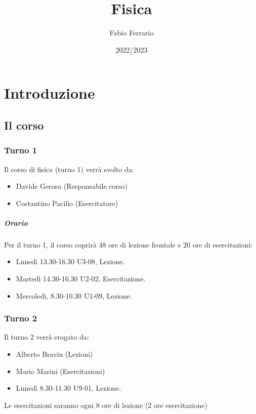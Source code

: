 \documentclass[12pt, a4paper, openany]{book}
\begin{document}
\title{Fisica}
\author{Fabio Ferrario}
\date{2022/2023}
\maketitle

\tableofcontents

\chapter{Introduzione}

\section{Il corso}
\subsection*{Turno 1}
Il corso di fisica (turno 1) verrà svolto da:
\begin{itemize}
    \item Davide Gerosa (Responsabile corso)
    \item Costantino Pacilio (Esercitatore)
\end{itemize} 
\paragraph*{Orario} Per il turno 1, il corso coprirà 48 ore di lezione frontale e 20 ore di esercitazioni:
\begin{itemize}
    \item Lunedì 13.30-16.30 U3-08, Lezione.
    \item Martedì 14.30-16.30 U2-02, Esercitazione.
    \item Mercoledì, 8.30-10.30 U1-09, Lezione.  
\end{itemize}
\subsection*{Turno 2}
Il turno 2 verrà erogato da:
\begin{itemize}
    \item Alberto Bravin (Lezioni)
    \item Mario Marini (Esercitazioni)
\end{itemize}
\begin{itemize}
    \item Lunedì 8.30-11.30 U9-01, Lezione.
 
\end{itemize}
Le esercitazioni saranno ogni 8 ore di lezione (2 ore esercitazione)
\end{document}

